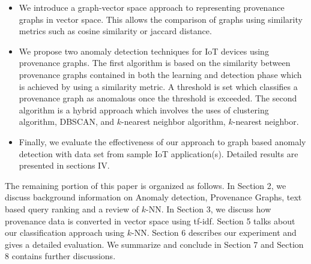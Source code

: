 
\begin{itemize}[noitemsep,wide=0pt, leftmargin=\dimexpr{} + 2\relax]

\item We introduce a graph-vector space approach to representing provenance graphs in vector space. This allows the comparison of graphs using similarity metrics such as cosine similarity or jaccard distance.




\item We propose two anomaly detection techniques for IoT devices using provenance graphs. The first algorithm is based on the similarity between provenance graphs contained in both the learning and detection phase which is achieved by using a similarity metric. A threshold is set which classifies a provenance graph as anomalous once the threshold is exceeded. The second algorithm is a hybrid approach which involves the uses of clustering algorithm, DBSCAN, and $k$-nearest neighbor algorithm, $k$-nearest neighbor.



\item Finally, we evaluate the effectiveness of our approach to graph based anomaly detection with data set from sample IoT application(s). Detailed results are presented in sections IV.


\end{itemize}

The remaining portion of this paper is organized as follows. In Section 2, we discuss background information on Anomaly detection, Provenance Graphs, text based query ranking and a review of $k$-NN. In Section 3, we discuss how provenance data is converted in vector space using tf-idf. Section 5 talks about our classification approach using $k$-NN. Section 6 describes our experiment and gives a detailed evaluation. We summarize and conclude in Section 7 and Section 8 contains further discussions.



